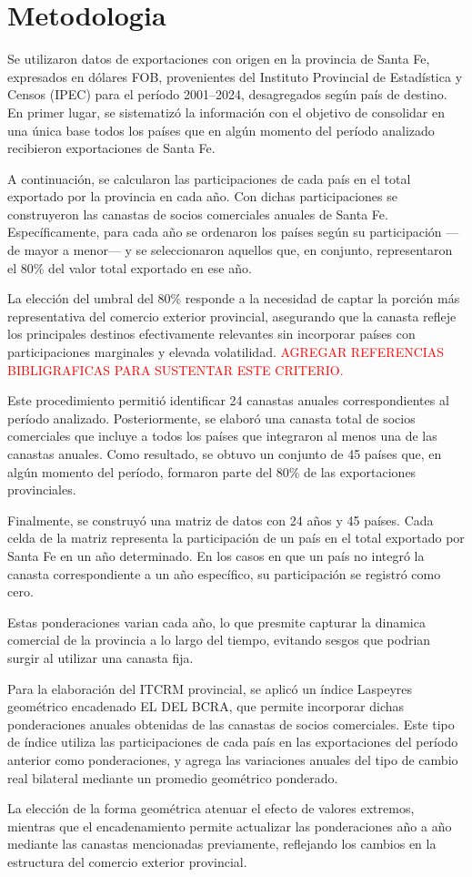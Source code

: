 \section{Metodologia}\label{section3} 
Se utilizaron datos de exportaciones con origen en la provincia de Santa Fe, expresados en dólares FOB, provenientes del Instituto Provincial de Estadística y Censos (IPEC) para el período 2001–2024, desagregados según país de destino.
En primer lugar, se sistematizó la información con el objetivo de consolidar en una única base todos los países que en algún momento del período analizado recibieron exportaciones de Santa Fe.

A continuación, se calcularon las participaciones de cada país en el total exportado por la provincia en cada año. Con dichas participaciones se construyeron las canastas de socios comerciales anuales de Santa Fe. Específicamente, para cada año se ordenaron los países según su participación —de mayor a menor— y se seleccionaron aquellos que, en conjunto, representaron el 80\% del valor total exportado en ese año. 

La elección del umbral del 80\% responde a la necesidad de captar la porción más representativa del comercio exterior provincial, asegurando que la canasta refleje los principales destinos efectivamente relevantes sin incorporar países con participaciones marginales y elevada volatilidad. \textcolor{red}{AGREGAR REFERENCIAS BIBLIGRAFICAS PARA SUSTENTAR ESTE CRITERIO.}

Este procedimiento permitió identificar 24 canastas anuales correspondientes al período analizado. Posteriormente, se elaboró una canasta total de socios comerciales que incluye a todos los países que integraron al menos una de las canastas anuales. Como resultado, se obtuvo un conjunto de 45 países que, en algún momento del período, formaron parte del 80\% de las exportaciones provinciales.

Finalmente, se construyó una matriz de datos con 24 años y 45 países. Cada celda de la matriz representa la participación de un país en el total exportado por Santa Fe en un año determinado. En los casos en que un país no integró la canasta correspondiente a un año específico, su participación se registró como cero.

Estas ponderaciones varian cada año, lo que presmite capturar la dinamica comercial de la provincia a lo largo del tiempo, evitando sesgos que podrian surgir al utilizar una canasta fija.

\vfill
Para la elaboración del ITCRM provincial, se aplicó un índice Laspeyres geométrico encadenado EL DEL BCRA, que permite incorporar dichas ponderaciones anuales obtenidas de las canastas de socios comerciales. Este tipo de índice utiliza las participaciones de cada país en las exportaciones del período anterior como ponderaciones, y agrega las variaciones anuales del tipo de cambio real bilateral mediante un promedio geométrico ponderado.

La elección de la forma geométrica atenuar el efecto de valores extremos, mientras que el encadenamiento permite actualizar las ponderaciones año a año mediante las canastas mencionadas previamente, reflejando los cambios en la estructura del comercio exterior provincial. 